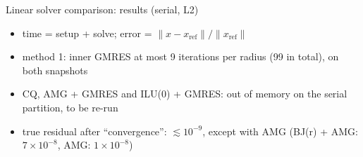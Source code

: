 \begin{frame}{Linear solver comparison: results (serial, L2)}
    \small
    \begin{center}
    \end{center}
    \vspace{0.3em}
    \begin{itemize}
        \item time = setup + solve; error = $\|x - x_\mathrm{ref}\| / \|x_\mathrm{ref}\|$
        \item method 1: inner GMRES at most 9 iterations per radius (99 in total), on both snapshots
        \item CQ, AMG + GMRES and ILU(0) + GMRES: out of memory on the serial partition, to be re-run
        \item true residual after ``convergence'': $\lesssim 10^{-9}$, except with AMG
              (BJ(r) + AMG: $7\times10^{-8}$, AMG: $1\times10^{-8}$)
    \end{itemize}
\end{frame}

